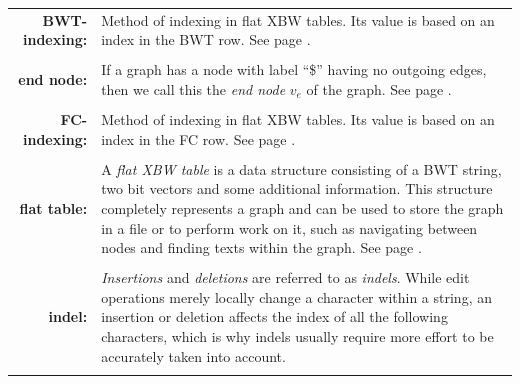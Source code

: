 \documentclass[a4paper,12pt,twoside,BCOR=10mm]{scrbook}
\begin{document}
\begin{tabular}{r p{12cm}}
\textbf{BWT-indexing:} & Method of indexing in flat XBW tables. 
Its value is based on an index in the BWT row. 
See page \pageref{def:bwt_indexing}.
\\ \\

\textbf{end node:} & If a graph has a node with label “\$” 
having no outgoing edges, then we call this the \textit{end node} $ v_e $ of the graph. 
See page \pageref{def:end_node}.
\\ \\

\textbf{FC-indexing:} & Method of indexing in flat XBW tables. 
Its value is based on an index in the FC row. 
See page \pageref{def:fc_indexing}.
\\ \\

\textbf{flat table:} & A \textit{flat XBW table} is a data structure consisting of a BWT string, 
two bit vectors and some additional information. This structure completely represents a graph 
and can be used to store the graph in a file or to perform work on it, such as navigating between 
nodes and finding texts within the graph. 
See page \pageref{def:flat_table}.
\\ \\

\textbf{indel:} & 
\textit{Insertions} and \textit{deletions} are referred to as \textit{indels}. While 
edit operations merely locally change a character within a string, an insertion or 
deletion affects the index of all the following characters, which is why indels 
usually require more effort to be accurately taken into account.
\\ \\

\end{tabular}
\end{document}
